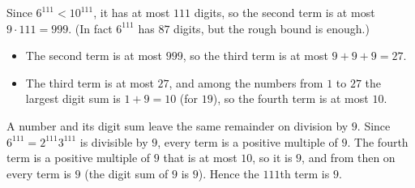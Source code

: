 Since $6^{111}<10^{111}$, it has at most $111$ digits, so the second term is at most $9\cdot111=999$. (In fact $6^{111}$ has $87$ digits, but the rough bound is enough.)
\begin{itemize}
\item The second term is at most $999$, so the third term is at most $9+9+9=27$.
\item The third term is at most $27$, and among the numbers from $1$ to $27$ the largest digit sum is $1+9=10$ (for $19$), so the fourth term is at most $10$.
\end{itemize}
A number and its digit sum leave the same remainder on division by $9$. Since $6^{111}=2^{111}3^{111}$ is divisible by $9$, every term is a positive multiple of $9$. The fourth term is a positive multiple of $9$ that is at most $10$, so it is $9$, and from then on every term is $9$ (the digit sum of $9$ is $9$). Hence the $111$th term is $\boxed{9}$.
